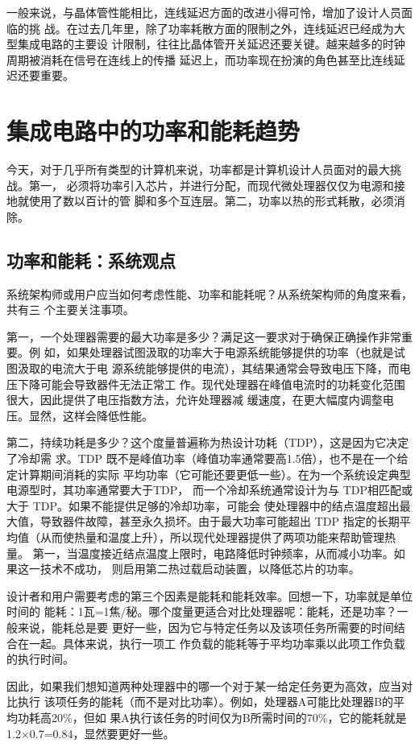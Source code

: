 一般来说，与晶体管性能相比，连线延迟方面的改进小得可怜，增加了设计人员面临的挑
战。在过去几年里，除了功率耗散方面的限制之外，连线延迟已经成为大型集成电路的主要设
计限制，往往比晶体管开关延迟还要关键。越来越多的时钟周期被消耗在信号在连线上的传播
延迟上，而功率现在扮演的角色甚至比连线延迟还要重要。

\section{集成电路中的功率和能耗趋势}
今天，对于几乎所有类型的计算机来说，功率都是计算机设计人员面对的最大挑战。第一，
必须将功率引入芯片，并进行分配，而现代微处理器仅仅为电源和接地就使用了数以百计的管
脚和多个互连层。第二，功率以热的形式耗散，必须消除。

\subsection{功率和能耗：系统观点}
系统架构师或用户应当如何考虑性能、功率和能耗呢？从系统架构师的角度来看，共有三
个主要关注事项。

第一，一个处理器需要的最大功率是多少？满足这一要求对于确保正确操作非常重要。例
如，如果处理器试图汲取的功率大于电源系统能够提供的功率（也就是试图汲取的电流大于电
源系统能够提供的电流），其结果通常会导致电压下降，而电压下降可能会导致器件无法正常工
作。现代处理器在峰值电流时的功耗变化范围很大，因此提供了电压指数方法，允许处理器减
缓速度，在更大幅度内调𤨣电压。显然，这样会降低性能。

第二，持续功耗是多少？这个度量普遍称为热设计功耗（TDP），这是因为它决定了冷却需
求。TDP 既不是峰值功率（峰值功率通常要高1.5倍），也不是在一个给定计算期间消耗的实际
平均功率（它可能还要更低一些）。在为一个系统设定典型电源型时，其功率通常要大于TDP，
而一个冷却系统通常设计为与 TDP相匹配或大于 TDP。如果不能提供足够的冷却功率，可能会
使处理器中的结点温度超出最大值，导致器件故障，甚至永久损坏。由于最大功率可能超出 TDP
指定的长期平均值（从而使热量和温度上升），所以现代处理器提供了两项功能来帮助管理热量。
第一，当温度接近结点温度上限时，电路降低时钟频率，从而减小功率。如果这一技术不成功，
则启用第二热过载启动装置，以降低芯片的功率。

设计者和用户需要考虑的第三个因素是能耗和能耗效率。回想一下，功率就是单位时间的
能耗：1瓦=1焦/秘。哪个度量更适合对比处理器呢：能耗，还是功率？一般来说，能耗总是要
更好一些，因为它与特定任务以及该项任务所需要的时间结合在一起。具体来说，执行一项工
作负载的能耗等于平均功率乘以此项工作负载的执行时间。

因此，如果我们想知道两种处理器中的哪一个对于某一给定任务更为高效，应当对比执行
该项任务的能耗（而不是对比功率）。例如，处理器A可能比处理器B的平均功耗高20\%，但如
果A执行该任务的时间仅为B所需时间的70\%，它的能耗就是1.2×0.7=0.84，显然要更好一些。

